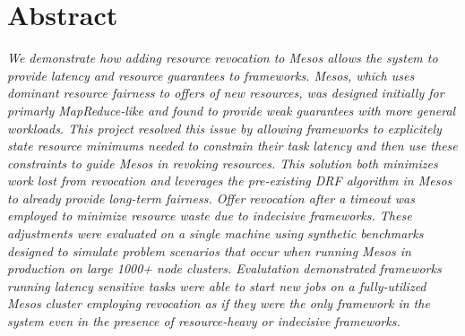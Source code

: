 \section{Abstract}
\textit{We demonstrate how adding resource revocation to Mesos allows the
system to provide latency and resource guarantees to frameworks. Mesos, which
uses dominant resource fairness to offers of new resources, was designed
initially for primarly MapReduce-like and found to provide weak guarantees with
more general workloads. This project resolved this issue by allowing frameworks
to explicitely state resource minimums needed to constrain their task latency
and then use these constraints to guide Mesos in revoking resources.  This
solution both minimizes work lost from revocation and leverages the
pre-existing DRF algorithm in Mesos to already provide long-term fairness.
Offer revocation after a timeout was employed to minimize resource waste due to
indecisive frameworks. These adjustments were evaluated on a single machine
using synthetic benchmarks designed to simulate problem scenarios that occur
when running Mesos in production on large 1000+ node clusters. Evalutation
demonstrated frameworks running latency sensitive tasks were able to start new
jobs on a fully-utilized Mesos cluster employing revocation as if they were the
only framework in the system even in the presence of resource-heavy or
indecisive frameworks.}
